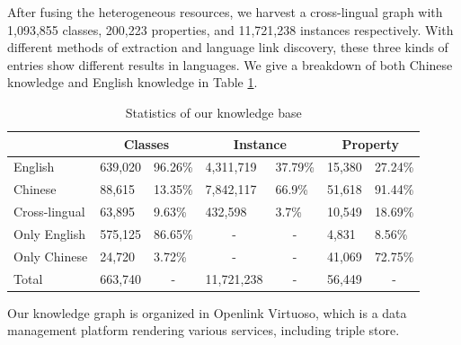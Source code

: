 \documentclass[runningheads,a4paper]{llncs}
\begin{document}
After fusing the heterogeneous resources, we harvest a cross-lingual graph with 1,093,855 classes, 200,223 properties, and 11,721,238 instances respectively. With different methods of extraction and language link discovery, these three kinds of entries show different results in languages. We give a breakdown of both Chinese knowledge and English knowledge in Table \ref{tab:kb-result}.

\begin{table}[h]
\small
\centering
\caption{Statistics of our knowledge base}
\label{tab:kb-result}
\begin{tabular}{|l|l|l|l|l|l|l|}
\hline
\multicolumn{1}{|c|}{} & \multicolumn{2}{c|}{Classes}     & \multicolumn{2}{c|}{Instance}                   & \multicolumn{2}{c|}{Property}    \\ \hline
English                & 639,020 & 96.26\%                & 4,311,719              & 37.79\%                & 15,380  & 27.24\%                \\ \hline
Chinese                & 88,615  & 13.35\%                & 7,842,117              & 66.9\%                 & 51,618  & 91.44\%                \\ \hline
Cross-lingual          & 63,895  & 9.63\%                 & 432,598                & 3.7\%                  & 10,549  & 18.69\%                \\ \hline
Only English           & 575,125 & 86.65\%                & \multicolumn{1}{c|}{-} & \multicolumn{1}{c|}{-} & 4,831   & 8.56\%                 \\ \hline
Only Chinese           & 24,720  & 3.72\%                 & \multicolumn{1}{c|}{-} & \multicolumn{1}{c|}{-} & 41,069  & 72.75\%                \\ \hline
Total                  & 663,740 & \multicolumn{1}{c|}{-} & 11,721,238             & \multicolumn{1}{c|}{-} & 56,449  & \multicolumn{1}{c|}{-} \\ \hline
\end{tabular}
\end{table}

Our knowledge graph is organized in Openlink Virtuoso, which is a data management platform rendering various services, including triple store.
\end{document}
